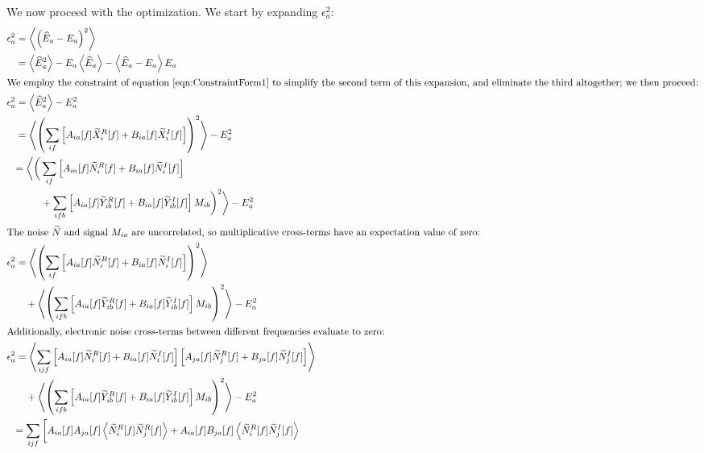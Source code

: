 We now proceed with the optimization.  We start by expanding $\epsilon^2_a$:
\begin{align}
\epsilon^2_a &= \left< \left(\widehat{E}_a - E_a\right)^2\right> \\
%
&= \left< \widehat{E}^2_a \right> - E_a \left<\widehat{E}_a\right> - \left< \widehat{E}_a - E_a \right> E_a \\
%
\intertext{We employ the constraint of equation~\ref{eqn:ConstraintForm1} to simplify the second term of this expansion, and eliminate the third altogether; we then proceed:}
%
\epsilon^2_a &= \left< \widehat{E}^2_a \right> - E^2_a \\
%
&= \left< \left(\sum_{if}\left[ A_{ia}[f] \widetilde{X}_i^R[f] + B_{ia}[f] \widetilde{X}_i^I[f]\right]\right)^2\right> - E^2_a \\
%
& \begin{aligned}= \bigg< \bigg(&
  \sum_{if} \left[ A_{ia}[f] \widetilde{N}_i^R[f] + B_{ia}[f] \widetilde{N}_i^I[f]\right] \\
  & + \sum_{ifb} \left[ A_{ia}[f] \widetilde{Y}_{ib}^R[f] + B_{ia}[f] \widetilde{Y}_{ib}^I[f]\right]M_{ib}  \bigg)^2 \bigg> - E^2_a
\end{aligned} \\
%
\intertext{The noise $\widetilde{N}$ and signal $M_{ia}$ are uncorrelated, so multiplicative cross-terms have an expectation value of zero:}
%
\epsilon^2_a &= \left< \left(\sum_{if} \left[ A_{ia}[f] \widetilde{N}_i^R[f] + B_{ia}[f] \widetilde{N}_i^I[f]\right]\right)^2\right> \nonumber \\
&\quad + \left<\left(\sum_{ifb} \left[ A_{ia}[f] \widetilde{Y}_{ib}^R[f] + B_{ia}[f] \widetilde{Y}_{ib}^I[f]\right]M_{ib} \right)^2 \right> - E^2_a \\
%
\intertext{Additionally, electronic noise cross-terms between different frequencies evaluate to zero:}
%
\epsilon^2_a &= \left< \sum_{ijf} \left[ A_{ia}[f] \widetilde{N}_i^R[f] + B_{ia}[f] \widetilde{N}_i^I[f]\right] \left[ A_{ja}[f] \widetilde{N}_j^R[f] + B_{ja}[f] \widetilde{N}_j^I[f]\right] \right> \nonumber \\
&\quad + \left<\left(\sum_{ifb} \left[ A_{ia}[f] \widetilde{Y}_{ib}^R[f] + B_{ia}[f] \widetilde{Y}_{ib}^I[f]\right]M_{ib} \right)^2 \right> - E^2_a \\
%
& \begin{aligned}
  = \sum_{ijf} \bigg[ & A_{ia}[f]A_{ja}[f] \left<\widetilde{N}_i^R[f]\widetilde{N}_j^R[f]\right> + A_{ia}[f]B_{ja}[f] \left<\widetilde{N}_i^R[f]\widetilde{N}_j^I[f]\right> \nonumber \\

\end{aligned}
\end{align}
